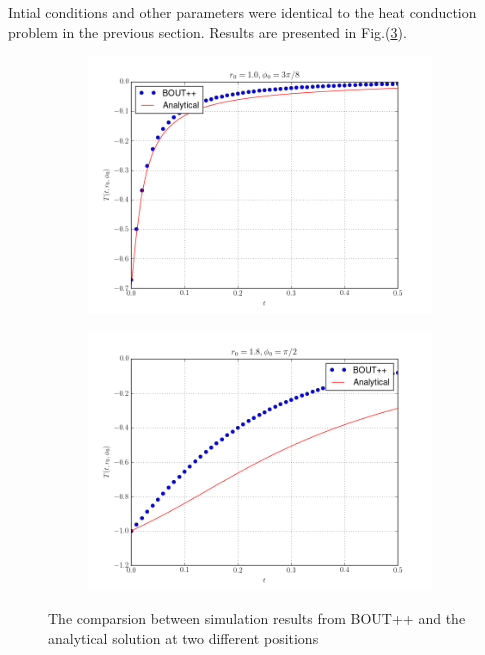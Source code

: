 \documentclass[11pt, oneside]{article}
\begin{document}
Intial conditions and other parameters were identical to the heat conduction problem in the previous section. Results are presented in Fig.(\ref{fig3}).
\begin{figure}
\centering
\begin{subfigure}{.5\textwidth}
  \centering
  \includegraphics[width=1.\linewidth]{pics/rad-cmpr-1.png}
  \caption{}
  \label{fig:sub21}
\end{subfigure}%
\begin{subfigure}{.5\textwidth}
  \centering
  \includegraphics[width=1.\linewidth]{pics/rad-cmpr-2.png}
  \caption{}
  \label{fig:sub22}
\end{subfigure}
\caption{The comparsion between simulation results from BOUT++ and the analytical solution at two different positions}
\label{fig3}
\end{figure}



{}

\end{document}
